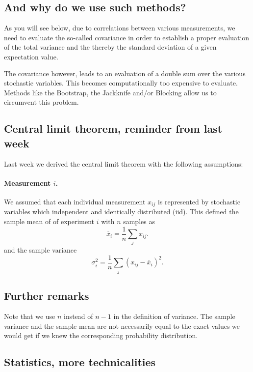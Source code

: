 \documentclass[%
oneside,                 %
final,                   %
10pt]{article}
\begin{document}
\noindent

    

\subsection*{And why do we use such methods?}

As you will see below, due to correlations between various
measurements, we need to evaluate the so-called covariance in order to
establish a proper evaluation of the total variance and the thereby
the standard deviation of a given expectation value.

The covariance however, leads to an evaluation of a double sum over the various stochastic variables. This becomes computationally too expensive to evaluate.
Methods like the Bootstrap, the Jackknife and/or Blocking allow us to circumvent this problem. 

\subsection*{Central limit theorem, reminder from last week}

Last week we derived the central limit theorem with the following assumptions:


\paragraph{Measurement $i$.}
We assumed that each individual measurement $x_{ij}$ is represented by stochastic variables which independent and identically distributed (iid).
This defined the sample mean of of experiment $i$ with $n$ samples as
\[
\overline{x}_i=\frac{1}{n}\sum_{j} x_{ij}.
\]
and the sample variance
\[
\sigma^2_i=\frac{1}{n}\sum_{j} \left(x_{ij}-\overline{x}_i\right)^2.
\]



\subsection*{Further remarks}

Note that we use $n$ instead of $n-1$ in the definition of
variance. The sample variance and the sample mean are not necessarily equal to
the exact values we would get if we knew the corresponding probability
distribution.

\subsection*{Statistics, more technicalities}
\end{document}
